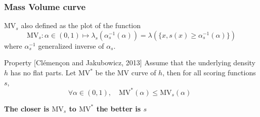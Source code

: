 \documentclass{beamer}
\begin{document}
\begin{frame}\frametitle{Mass Volume curve}

\vspace{-0.8cm}

$\text{MV}_s$ also defined as the plot of the function
\begin{equation*}
\text{MV}_s : \alpha \in (0, 1) \mapsto \lambda_s(\alpha_s^{-1}(\alpha)) = \lambda(\{x, s(x) \geq \alpha_s^{-1}(\alpha)\})
\end{equation*}
where $\alpha_s^{-1}$ generalized inverse of $\alpha_s$.

\vspace{0.2cm}
\begin{block}{Property {\color{bleu}[Clémençon and Jakubowicz, 2013]}}
Assume that the underlying density $h$ has no flat parts. Let $\text{MV}^*$ be the MV curve of $h$, then for all scoring functions $s$,
\begin{equation*}
\forall \alpha \in (0, 1), \quad \text{MV}^*(\alpha) \leq \text{MV}_s(\alpha) \enspace
\end{equation*}
\end{block}

\centering \textbf{The closer is $\text{MV}_s$ to $\text{MV}^*$ the better is $s$}


\end{frame}
\end{document}
